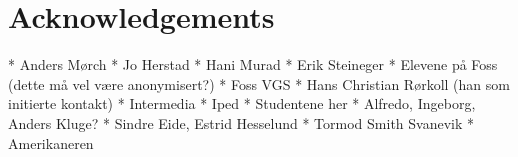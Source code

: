 \section*{Acknowledgements}

* Anders Mørch
* Jo Herstad
* Hani Murad
* Erik Steineger
* Elevene på Foss (dette må vel være anonymisert?)
* Foss VGS
* Hans Christian Rørkoll (han som initierte kontakt)
* Intermedia
* Iped
* Studentene her
* Alfredo, Ingeborg, Anders Kluge?
* Sindre Eide, Estrid Hesselund
* Tormod Smith Svanevik
* Amerikaneren

\newpage